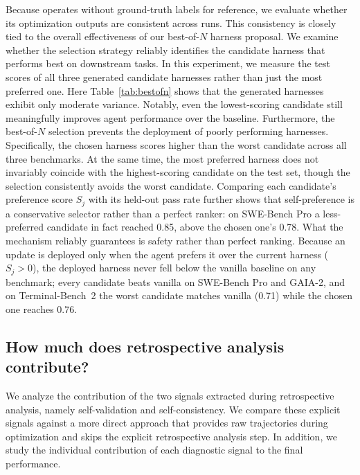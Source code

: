 Because \method{} operates without ground-truth labels for reference, we evaluate whether its optimization outputs are consistent across runs.
This consistency is closely tied to the overall effectiveness of our best-of-$N$ harness proposal.
We examine whether the selection strategy reliably identifies the candidate harness that performs best on downstream tasks.
In this experiment, we measure the test scores of all three generated candidate harnesses rather than just the most preferred one.
Here Table~\ref{tab:bestofn} shows that the generated harnesses exhibit only moderate variance.
Notably, even the lowest-scoring candidate still meaningfully improves agent performance over the baseline.
Furthermore, the best-of-$N$ selection prevents the deployment of poorly performing harnesses.
Specifically, the chosen harness scores higher than the worst candidate across all three benchmarks.
At the same time, the most preferred harness does not invariably coincide with the highest-scoring candidate on the test set, though the selection consistently avoids the worst candidate.
Comparing each candidate's preference score $S_j$ with its held-out pass rate further shows that self-preference is a conservative selector rather than a perfect ranker: on SWE-Bench Pro a less-preferred candidate in fact reached 0.85, above the chosen one's 0.78.
What the mechanism reliably guarantees is safety rather than perfect ranking.
Because an update is deployed only when the agent prefers it over the current harness ($S_j > 0$), the deployed harness never fell below the vanilla baseline on any benchmark; every candidate beats vanilla on SWE-Bench Pro and GAIA-2, and on Terminal-Bench~2 the worst candidate matches vanilla (0.71) while the chosen one reaches 0.76.



\subsection{How much does retrospective analysis contribute?}
\label{sec:disc-diagnosis}

We analyze the contribution of the two signals extracted during retrospective analysis, namely self-validation and self-consistency.
We compare these explicit signals against a more direct approach that provides raw trajectories during optimization and skips the explicit retrospective analysis step.
In addition, we study the individual contribution of each diagnostic signal to the final performance.

